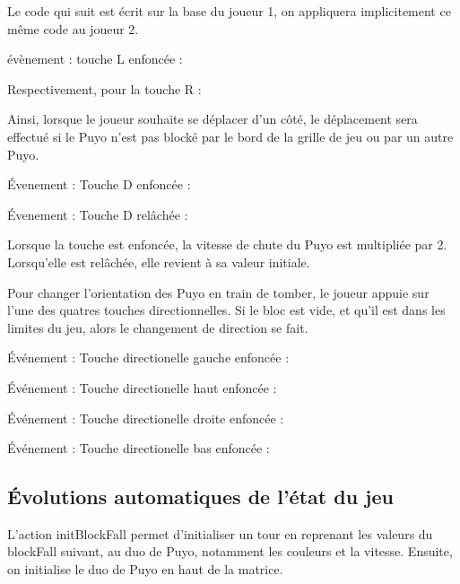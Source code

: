 \documentclass[11pt]{report}
\begin{document}
Le code 	qui suit est écrit sur la base du joueur 1, on appliquera implicitement ce même code au joueur 2. 

évènement : touche L enfoncée :


Respectivement, pour la touche R : 


Ainsi, lorsque le joueur souhaite se déplacer d'un côté, le déplacement sera effectué si le Puyo n'est pas blocké par le bord de la grille de jeu ou par un autre Puyo. 

Évenement : Touche D enfoncée : 


Évenement : Touche D relâchée : 


Lorsque la touche est enfoncée, la vitesse de chute du Puyo est multipliée par 2. Lorsqu'elle est relâchée, elle revient à sa valeur initiale. 

Pour changer l'orientation des Puyo en train de tomber, le joueur appuie sur l'une des quatres touches directionnelles. Si le bloc est vide, et qu'il est dans les limites du jeu, alors le changement de direction se fait. 

Événement : Touche directionelle gauche enfoncée : 


Événement : Touche directionelle haut enfoncée : 


Événement : Touche directionelle droite enfoncée :


Événement : Touche directionelle bas enfoncée :


\subsection{Évolutions automatiques de l’état du jeu}



L’action initBlockFall permet d’initialiser un tour en reprenant les valeurs du blockFall suivant, au duo de Puyo, notamment les couleurs et la vitesse. Ensuite, on initialise le duo de Puyo en haut de la matrice. 


\end{document}
